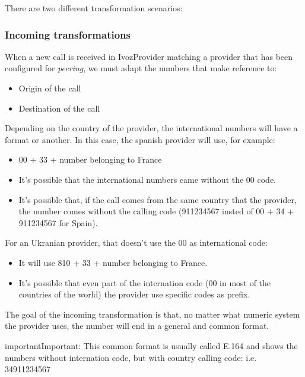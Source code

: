 \documentclass[letterpaper,10pt,english]{sphinxmanual}
\begin{document}
There are two different transformation scenarios:


\subsubsection{Incoming transformations}
\label{external_incoming_calls/numeric_transformations:incoming-transformations}
When a new call is received in IvozProvider matching a provider that has been
configured for \emph{peering}, we must adapt the numbers that make reference to:
\begin{itemize}
\item {} 
Origin of the call

\item {} 
Destination of the call

\end{itemize}

Depending on the country of the provider, the international numbers will have
a format or another. In this case, the spanish provider will use, for example:
\begin{itemize}
\item {} 
00 + 33 + number belonging to France

\item {} 
It's possible that the international numbers came without the 00 code.

\item {} 
It's possible that, if the call comes from the same country that the provider,
the number comes without the calling code (911234567 insted of 00 + 34 +
911234567 for Spain).

\end{itemize}

For an Ukranian provider, that doesn't use the 00 as international code:
\begin{itemize}
\item {} 
It will use 810 + 33 + number belonging to France.

\item {} 
It's possible that even part of the internation code (00 in most of the
countries of the world) the provider use specific codes as prefix.

\end{itemize}

The goal of the incoming transformation is that, no matter what numeric system
the provider uses, the number will end in a general and common format.
\label{external_incoming_calls/numeric_transformations:e164}
\begin{notice}{important}{Important:}
This common format is usually called E.164 and shows the numbers
without internation code, but with country calling code: i.e. 34911234567
\end{notice}
\end{document}
